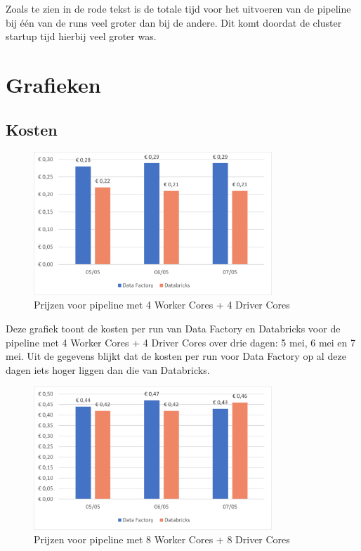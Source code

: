 Zoals te zien in de rode tekst is de totale tijd voor het uitvoeren van de pipeline bij één van de runs veel groter dan bij de andere. Dit komt doordat de cluster startup tijd hierbij veel groter was.

\section{Grafieken}

\subsection{Kosten}

\begin{figure}[H]
    \centering
    \includegraphics[width=0.8\textwidth]{./graphics/kosten/graf1.png}
    \caption{Prijzen voor pipeline met 4 Worker Cores + 4 Driver Cores}
\end{figure}
    
Deze grafiek toont de kosten per run van Data Factory en Databricks voor de pipeline met 4 Worker Cores + 4 Driver Cores over drie dagen: 5 mei, 6 mei en 7 mei. Uit de gegevens blijkt dat de kosten per run voor Data Factory op al deze dagen iets hoger liggen dan die van Databricks.

\begin{figure}[H]
    \centering
    \includegraphics[width=0.8\textwidth]{./graphics/kosten/graf2.png}
    \caption{Prijzen voor pipeline met 8 Worker Cores + 8 Driver Cores}
\end{figure}

